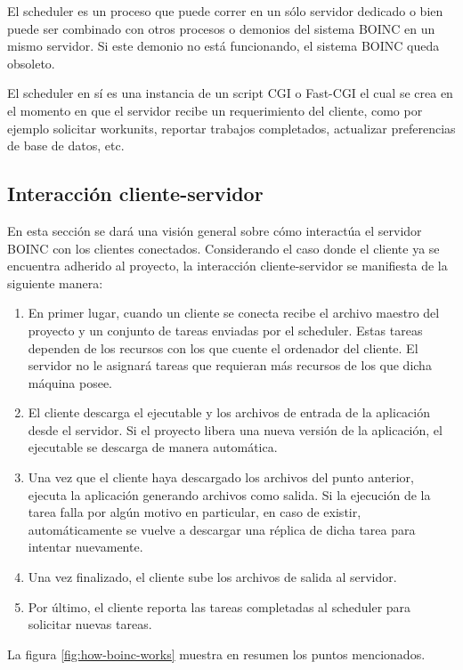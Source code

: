 El scheduler es un proceso que puede correr en un sólo servidor dedicado o bien puede ser combinado con otros procesos o demonios del sistema BOINC en un mismo servidor. Si este demonio no está funcionando, el sistema BOINC queda obsoleto.

El scheduler en sí es una instancia de un script CGI o Fast-CGI el cual se crea en el momento en que el servidor recibe un requerimiento del cliente, como por ejemplo solicitar workunits, reportar trabajos completados, actualizar preferencias de base de datos, etc.

\subsection{Interacción cliente-servidor}

En esta sección se dará una visión general sobre cómo interactúa el servidor BOINC con los clientes conectados. Considerando el caso donde el cliente ya se encuentra adherido al proyecto, la interacción cliente-servidor se manifiesta de la siguiente manera:

\begin{enumerate}
\item En primer lugar, cuando un cliente se conecta recibe el archivo maestro del proyecto y un conjunto de tareas enviadas por el scheduler. Estas tareas dependen de los recursos con los que cuente el ordenador del cliente. El servidor no le asignará tareas que requieran más recursos de los que dicha máquina posee.
\item El cliente descarga el ejecutable y los archivos de entrada de la aplicación desde el servidor. Si el proyecto libera una nueva versión de la aplicación, el ejecutable se descarga de manera automática.
\item Una vez que el cliente haya descargado los archivos del punto anterior, ejecuta la aplicación generando archivos como salida. Si la ejecución de la tarea falla por algún motivo en particular, en caso de existir, automáticamente se vuelve a descargar una réplica de dicha tarea para intentar nuevamente.
\item Una vez finalizado, el cliente sube los archivos de salida al servidor.
\item Por último, el cliente reporta las tareas completadas al scheduler para solicitar nuevas tareas.
\end{enumerate}

La figura \ref{fig:how-boinc-works} muestra en resumen los puntos mencionados.

